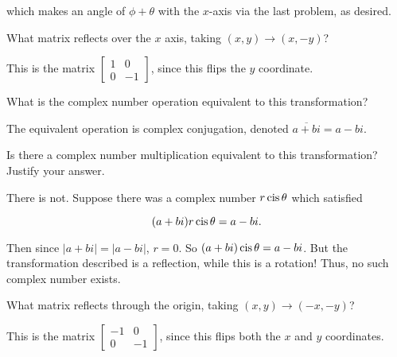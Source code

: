 \documentclass[../gatm_answers.tex]{subfiles}
\begin{document}
which makes an angle of $\phi + \theta$ with the $x$-axis via the last problem, as desired.

\begin{outer_problem}
\item 
\end{outer_problem}

\begin{inner_problem}[start=1]
\item What matrix reflects over the $x$ axis, taking $(x,y)\to (x,-y)$?
\end{inner_problem}

This is the matrix $\begin{bmatrix} 1 & 0 \\ 0 & -1 \end{bmatrix}$, since this flips the $y$ coordinate.

\begin{inner_problem}
\item What is the complex number operation equivalent to this transformation?
\end{inner_problem}

The equivalent operation is complex conjugation, denoted $\overline{a+bi} = a-bi$.

\begin{inner_problem}
\item Is there a complex number multiplication equivalent to this transformation? Justify your answer.
\end{inner_problem}

There is not. Suppose there was a complex number $r\operatorname{cis}\theta$ which satisfied

$$(a+bi)r\operatorname{cis}\theta = a-bi.$$

Then since $|a+bi| = |a-bi|$, $r=0$. So $(a+bi)\operatorname{cis}\theta = a-bi$. But the transformation described is a reflection, while this is a rotation! Thus, no such complex number exists.

\begin{outer_problem}
\item 
\end{outer_problem}

\begin{inner_problem}[start=1]
\item What matrix reflects through the origin, taking $(x,y)\to (-x,-y)$?
\end{inner_problem}

This is the matrix $\begin{bmatrix} -1 & 0 \\ 0 & -1 \end{bmatrix}$, since this flips both the $x$ and $y$ coordinates.
\end{document}
